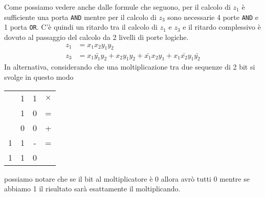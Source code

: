 Come possiamo vedere anche dalle formule che seguono, per il calcolo di $z_1$ è sufficiente una
porta \verb|AND| mentre per il calcolo di $z_3$ sono necessarie 4 porte \verb|AND| e 1 porta
\verb|OR|. C'è quindi un ritardo tra il calcolo di $z_1$ e $z_3$ e il ritardo complessivo è dovuto
al passaggio del calcolo da 2 livelli di porte logiche.
\begin{align*}
	z_1 & = x_1 x_2 y_1 y_2                                                                   \\
	z_3 & = x_1 \bar{y_1} y_2 + x_2 y_1 y_2 + \bar{x_1} x_2 y_1 + x_1 \bar{x_2} y_1 \bar{y_2}
\end{align*}
In alternativa, considerando che una moltiplicazione tra due sequenze di 2 bit si svolge in questo
modo
\begin{center}
	\begin{tabular}{c c c c}
		  & 1 & 1 & $\times$ \\
		  & 1 & 0 & =        \\ \hline
		  & 0 & 0 & +        \\
		1 & 1 & - & =        \\ \hline
		1 & 1 & 0
	\end{tabular}
\end{center}
possiamo notare che se il bit al moltiplicatore è 0 allora avrò tutti 0 mentre se abbiamo 1 il
risultato sarà esattamente il moltiplicando.